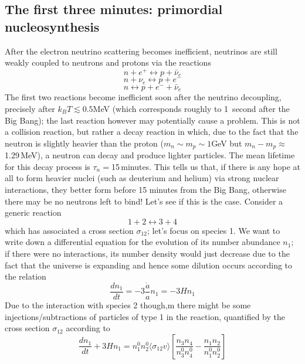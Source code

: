 \subsection{The first three minutes: primordial nucleosynthesis}
After the electron neutrino scattering becomes inefficient, neutrinos are still weakly coupled to neutrons and protons via the reactions 
\begin{equation}
\label{proton1}
n+e^+\leftrightarrow p+\bar{\nu}_e
\end{equation}
\begin{equation}
\label{proton2}
n+\nu_e\leftrightarrow p+e^-
\end{equation}
\begin{equation}
n\leftrightarrow p+e^-+\bar{\nu}_e
\end{equation}
The first two reactions become inefficient soon after the neutrino decoupling, precisely after $k_BT\lesssim 0.5$MeV (which corresponds roughly to 1\, second after the Big Bang); the last reaction however may potentially cause a problem. This is not a collision reaction, but rather a decay reaction in which, due to the fact that the neutron is slightly heavier than the proton ($m_n\sim m_p\sim 1$GeV but $m_n-m_p\approx$1.29\,MeV), a neutron can decay and produce lighter particles. The mean lifetime for this decay process is $\tau_n=$15\,minutes. This tells us that, if there is any hope at all to form heavier nuclei (such as deuterium and helium) via strong nuclear interactions, they better form before 15 minutes from the Big Bang, otherwise there may be no neutrons left to bind! Let's see if this is the case. Consider a generic reaction 
\begin{equation}
1+2\leftrightarrow 3+4
\end{equation}
which has associated a cross section $\sigma_{12}$; let's focus on species 1. We want to write down a differential equation for the evolution of its number abundance $n_1$; if there were no interactions, its number density would just decrease due to the fact that the universe is expanding and hence some dilution occurs according to the relation 
\begin{equation}
\label{ateq}
\frac{dn_1}{dt}=-3\frac{\dot{a}}{a}n_1=-3Hn_1
\end{equation}
Due to the interaction with species 2 though,m there might be some injections/subtractions of particles of type 1 in the reaction, quantified by the cross section $\sigma_{12}$ according to 
\begin{equation}
\label{balancenoneq}
\frac{dn_1}{dt}+3Hn_1=n_1^0n_2^0\langle \sigma_{12}v\rangle\left[\frac{n_3n_4}{n_3^0n_4^0}-\frac{n_1n_2}{n_1^0n_2^0}\right]
\end{equation} 
